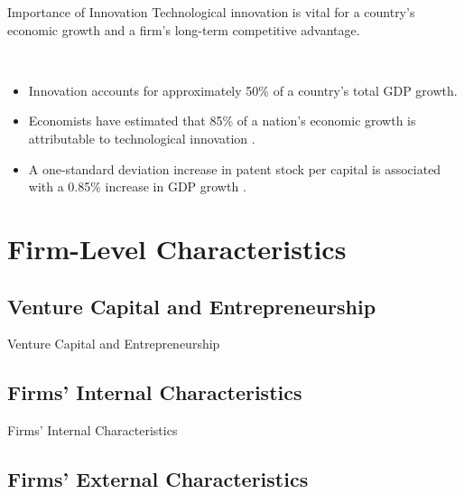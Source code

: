 \documentclass{beamer}
\begin{document}
    \begin{frame}{Importance of Innovation}
        Technological innovation is vital for a country's economic growth and a firm's long-term competitive advantage.

        ~

        \begin{itemize}
            \item Innovation accounts for approximately 50\% of a country's total GDP growth.
            \item Economists have estimated that 85\% of a nation's economic growth is attributable to technological innovation \citep{R2006InnovationGrowthTourism}.
            \item A one-standard deviation increase in patent stock per capital is associated with a 0.85\% increase in GDP growth \citep{CMZZ2018PatentsPortendProductivity}.
        \end{itemize}
        
    \end{frame}

    \section[Firm-Level Char.]{Firm-Level Characteristics}

    \subsection{Venture Capital and Entrepreneurship}

    \begin{frame}{Venture Capital and Entrepreneurship}

    \end{frame}

    \subsection{Firms' Internal Characteristics}

    \begin{frame}{Firms' Internal Characteristics}

    \end{frame}

    \subsection{Firms' External Characteristics}
\end{document}
